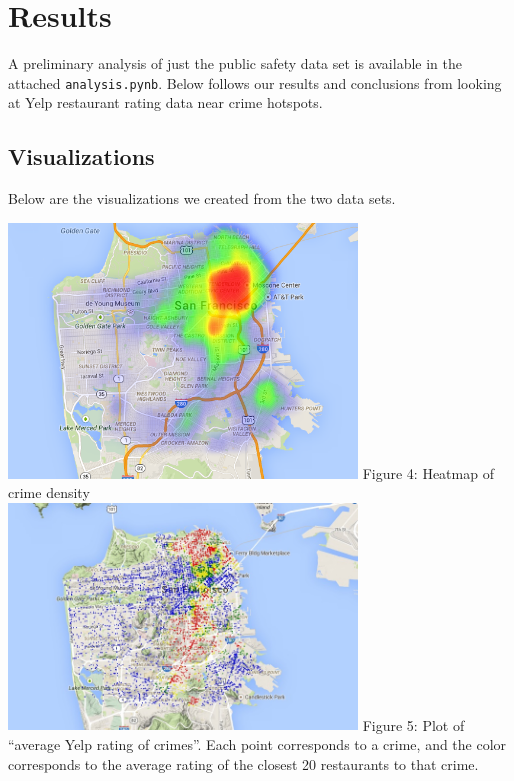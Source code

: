 \documentclass{article}
\begin{document}
\section{Results}
\label{sec:results}

A preliminary analysis of just the public safety data set is available in
the attached \texttt{analysis.pynb}. Below follows our results and
conclusions from looking at Yelp restaurant rating data near crime
hotspots.

\subsection{Visualizations}

Below are the visualizations we created from the two data sets.

\begin{center}
  \includegraphics[keepaspectratio=true, width=350px]{crime_density_heatmap.png}
  Figure 4: Heatmap of crime density \\[20pt]

  \includegraphics[keepaspectratio=true, width=350px]{all_yelp_ratings_plotted.jpg}
  Figure 5: Plot of ``average Yelp rating of crimes''. Each point
  corresponds to a crime, and the color corresponds to the average rating
  of the closest 20 restaurants to that crime. \\[20pt]


\end{center}
\end{document}
